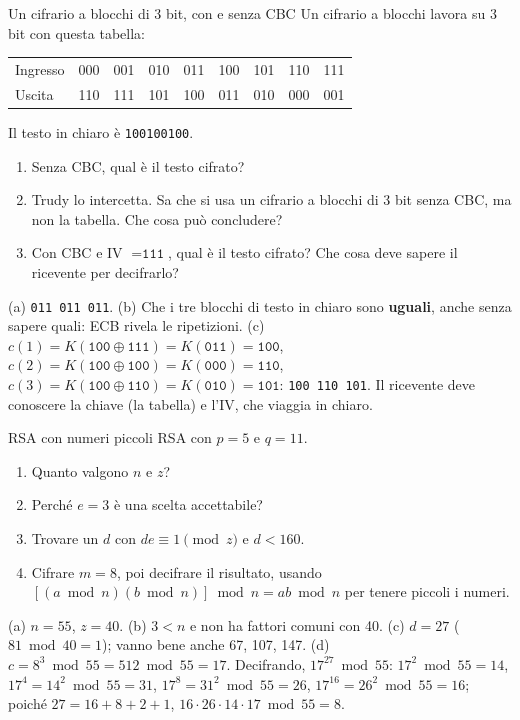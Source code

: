 \begin{esercizio}{Un cifrario a blocchi di 3 bit, con e senza CBC}
Un cifrario a blocchi lavora su 3 bit con questa tabella:
\begin{center}
\small\ttfamily
\begin{tabular}{l*{8}{c}}
\toprule
\textrm{Ingresso} & 000 & 001 & 010 & 011 & 100 & 101 & 110 & 111 \\
\textrm{Uscita} & 110 & 111 & 101 & 100 & 011 & 010 & 000 & 001 \\
\bottomrule
\end{tabular}
\end{center}
Il testo in chiaro è \texttt{100100100}.
\begin{enumerate}[label=(\alph*)]
    \item Senza CBC, qual è il testo cifrato?
    \item Trudy lo intercetta. Sa che si usa un cifrario a blocchi di 3 bit senza CBC, ma non la tabella. Che cosa può concludere?
    \item Con CBC e IV $= \texttt{111}$, qual è il testo cifrato? Che cosa deve sapere il ricevente per decifrarlo?
\end{enumerate}

\svolgimento
(a) \texttt{011 011 011}. (b) Che i tre blocchi di testo in chiaro sono \textbf{uguali}, anche senza sapere quali: ECB rivela le ripetizioni.
(c) $c(1) = K(\texttt{100} \oplus \texttt{111}) = K(\texttt{011}) = \texttt{100}$, $c(2) = K(\texttt{100} \oplus \texttt{100}) =
K(\texttt{000}) = \texttt{110}$, $c(3) = K(\texttt{100} \oplus \texttt{110}) = K(\texttt{010}) = \texttt{101}$: \texttt{100 110 101}. Il
ricevente deve conoscere la chiave (la tabella) e l'IV, che viaggia in chiaro.
\end{esercizio}

\begin{esercizio}{RSA con numeri piccoli}
RSA con $p = 5$ e $q = 11$.
\begin{enumerate}[label=(\alph*)]
    \item Quanto valgono $n$ e $z$?
    \item Perché $e = 3$ è una scelta accettabile?
    \item Trovare un $d$ con $de \equiv 1 \pmod z$ e $d < 160$.
    \item Cifrare $m = 8$, poi decifrare il risultato, usando $[(a \bmod n)(b \bmod n)] \bmod n = ab \bmod n$ per tenere piccoli i numeri.
\end{enumerate}

\svolgimento
(a) $n = 55$, $z = 40$. (b) $3 < n$ e non ha fattori comuni con 40. (c) $d = 27$ ($81 \bmod 40 = 1$); vanno bene anche 67, 107, 147. (d) $c
= 8^3 \bmod 55 = 512 \bmod 55 = 17$. Decifrando, $17^{27} \bmod 55$: $17^2 \bmod 55 = 14$, $17^4 = 14^2 \bmod 55 = 31$, $17^8 = 31^2 \bmod
55 = 26$, $17^{16} = 26^2 \bmod 55 = 16$; poiché $27 = 16 + 8 + 2 + 1$, $16 \cdot 26 \cdot 14 \cdot 17 \bmod 55 = 8$.
\end{esercizio}

